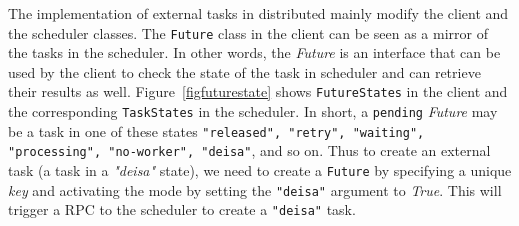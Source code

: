 The implementation of external tasks in \dask distributed mainly modify the client and the scheduler classes. The \texttt{Future} class in the client can be seen as a mirror of the tasks in the scheduler. In other words, the \textit{Future} is an interface that can be used by the client to check the state of the task in \dask scheduler and can retrieve their results as well. Figure~\ref{figfuturestate} shows \texttt{FutureStates} in the client and the corresponding \texttt{TaskStates} in the scheduler. In short, a \texttt{pending} \textit{Future} may be a task in one of these states {\texttt{"released", "retry", "waiting", "processing", "no-worker", "deisa"}}, and so on.  Thus to create an external task (a task in a \textit{"deisa"} state), we need to create a \texttt{Future} by specifying a unique \textit{key} and activating the \deisa mode by setting the \texttt{"deisa"} argument to \textit{True}. This will trigger a RPC to the scheduler to create a \texttt{"deisa"} task. 

